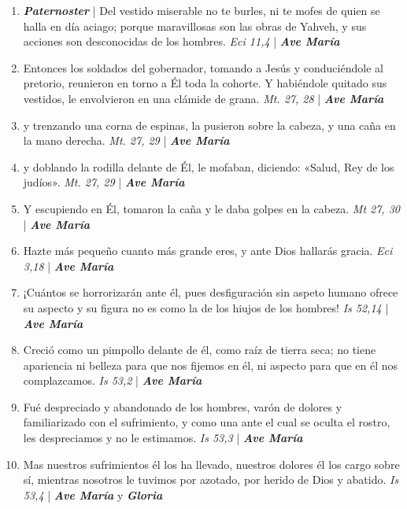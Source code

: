 \documentclass[../../devocionario.tex]{subfiles}
\begin{document}
    \begin{enumerate}
    
        \item \textbf{\textit{Paternoster}} | Del vestido miserable no te burles, ni te mofes de quien se halla en día aciago; 
            porque maravillosas son las obras de Yahveh, y sus acciones son desconocidas de los hombres. \textit{Eci 11,4} | \textbf{\textit{Ave María}}

        \item Entonces los soldados del gobernador, tomando a Jesús y conduciéndole al pretorio, reunieron en torno a Él toda la cohorte. 
            Y habiéndole quitado sus vestidos, le envolvieron en una clámide de grana. \textit{Mt. 27, 28} | \textbf{\textit{Ave María}}

        \item y trenzando una corna de espinas, la pusieron sobre la cabeza, y una caña en la mano derecha. \textit{Mt. 27, 29} | \textbf{\textit{Ave María}}

        \item y doblando la rodilla delante de Él, le mofaban, diciendo: «Salud, Rey de los judíos». \textit{Mt. 27, 29} | \textbf{\textit{Ave María}}

        \item Y escupiendo en Él, tomaron la caña y le daba golpes en la cabeza. \textit{Mt 27, 30} | \textbf{\textit{Ave María}}

        \item Hazte más pequeño cuanto más grande eres, y ante Dios hallarás gracia. \textit{Eci 3,18} | \textbf{\textit{Ave María}}

        \item ¡Cuántos se horrorizarán ante él, pues desfiguración sin aspeto humano ofrece su aspecto y su figura 
            no es como la de los hiujos de los hombres! \textit{Is 52,14} | \textbf{\textit{Ave María}}

        \item Creció como un pimpollo delante de él, como raíz de tierra seca; no tiene apariencia ni belleza para 
            que nos fijemos en él, ni aspecto para que en él nos complazcamos. \textit{Is 53,2} | \textbf{\textit{Ave María}}

        \item Fué despreciado y abandonado de los hombres, varón de dolores y familiarizado con el sufrimiento, 
            y como una ante el cual se oculta el rostro, les despreciamos y no le estimamos. \textit{Is 53,3} | \textbf{\textit{Ave María}}

        \item Mas nuestros sufrimientos él los ha llevado, nuestros dolores él los cargo sobre sí, 
            mientras nosotros le tuvimos por azotado, por herido de Dios y abatido. \textit{Is 53,4} | \textbf{\textit{Ave María}} y \textbf{\textit{Gloria}}

    \end{enumerate}
\end{document}
